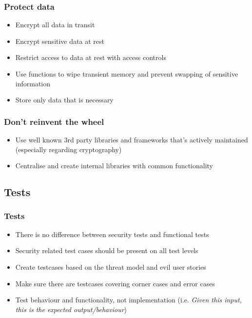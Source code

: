 \documentclass{beamer}
\begin{document}
    \begin{frame}
      \frametitle{Protect data}
      \begin{itemize}
        \item Encrypt all data in transit
        \item Encrypt sensitive data at rest
        \item Restrict access to data at rest with access controls
        \item Use functions to wipe transient memory and prevent swapping of sensitive information
        \item Store only data that is necessary
      \end{itemize}
    \end{frame}
    \begin{frame}
      \frametitle{Don't reinvent the wheel}
      \begin{itemize}
        \item Use well known 3rd party libraries and frameworks that's actively maintained (especially regarding cryptography)
        \item Centralise and create internal libraries with common functionality
      \end{itemize}
    \end{frame}

  \subsection{Tests}
    \begin{frame}
      \frametitle{Tests}
      \begin{itemize}
        \item There is no difference between security tests and functional tests
        \item Security related test cases should be present on all test levels
        \item Create testcases based on the threat model and evil user stories
        \item Make sure there are testcases covering corner cases and error cases
        \item Test behaviour and functionality, not implementation (i.e. \emph{Given this input, this is the expected output/behaviour})
      \end{itemize}
    \end{frame}
\end{document}
